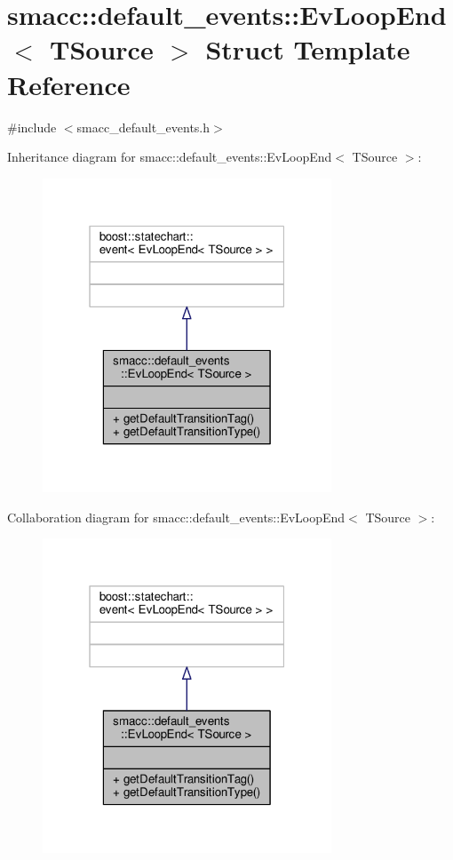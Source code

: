 \hypertarget{structsmacc_1_1default__events_1_1EvLoopEnd}{}\section{smacc\+:\+:default\+\_\+events\+:\+:Ev\+Loop\+End$<$ T\+Source $>$ Struct Template Reference}
\label{structsmacc_1_1default__events_1_1EvLoopEnd}


{\ttfamily \#include $<$smacc\+\_\+default\+\_\+events.\+h$>$}



Inheritance diagram for smacc\+:\+:default\+\_\+events\+:\+:Ev\+Loop\+End$<$ T\+Source $>$\+:\nopagebreak
\begin{figure}[H]
\begin{center}
\leavevmode
\includegraphics[width=244pt]{structsmacc_1_1default__events_1_1EvLoopEnd__inherit__graph}
\end{center}
\end{figure}


Collaboration diagram for smacc\+:\+:default\+\_\+events\+:\+:Ev\+Loop\+End$<$ T\+Source $>$\+:\nopagebreak
\begin{figure}[H]
\begin{center}
\leavevmode
\includegraphics[width=244pt]{structsmacc_1_1default__events_1_1EvLoopEnd__coll__graph}
\end{center}
\end{figure}
